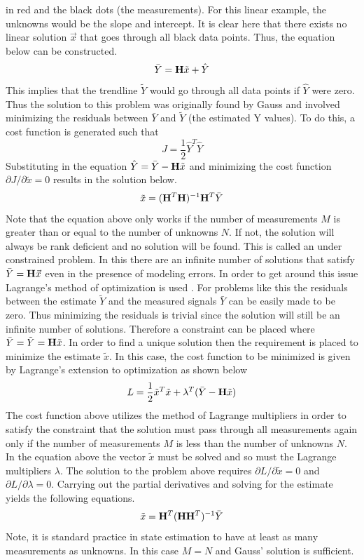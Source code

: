 \documentclass{article}
\begin{document}
in red and the black dots (the measurements). For this linear example,
the unknowns would be the slope and intercept. It is clear here that
there exists no linear solution $\vec{x}$ that goes through all black
data points. Thus, the equation below can be constructed.
\begin{equation}
  \bar{Y} = {\bf H}\tilde{x} + \hat{Y}
\end{equation}
This implies that the trendline $\tilde{Y}$ would go through all data
points if $\hat{Y}$ were zero. Thus the solution to this problem was
originally found by Gauss \cite{stigler1981} and involved minimizing
the residuals between $\bar{Y}$ and $\tilde{Y}$ (the estimated Y
values). To do this, a cost function is generated such that
\begin{equation}
  J = \frac{1}{2}\hat{Y}^T \hat{Y}
\end{equation}
Substituting in the equation $\hat{Y} = \bar{Y} - {\bf H}\tilde{x}$
and minimizing the cost function $\partial J/\partial \tilde{x} = 0$
results in the solution below.
\begin{equation}
  \tilde{x} = ({\bf H}^T{\bf H})^{-1}{\bf H}^T\bar{Y}
\end{equation}
Note that the equation above only works if the number of measurements $M$
is greater than or equal to the number of unknowns $N$. If not, the
solution will always be rank deficient and no solution will be
found. This is called an under constrained problem. In this there are
an infinite number of solutions that satisfy $\bar{Y} = {\bf
  H}\vec{x}$ even in the presence of modeling errors. In order
to get around this issue Lagrange's method of 
optimization is used \cite{lagrange}. For problems like this the
residuals between the estimate $\tilde{Y}$ and the measured signals
$\bar{Y}$ can be easily made to be zero. Thus minimizing the residuals
is trivial since the solution will still be an infinite number of
solutions. Therefore a constraint can be placed where
$\bar{Y}=\tilde{Y}={\bf H}\tilde{x}$. In order to find a unique
solution then the requirement is placed to minimize the estimate
$\tilde{x}$. In this case, the cost function
to be minimized is given by Lagrange's extension to optimization as
shown below
\begin{equation}
L = \frac{1}{2}\tilde{x}^T\tilde{x} + \lambda^T(\bar{Y}-{\bf H}\tilde{x})
\end{equation}
The cost function above utilizes the method of Lagrange multipliers in
order to satisfy the constraint that the solution must pass through
all measurements again only if the number of measurements $M$ is less than
the number of unknowns $N$. In the equation above the vector
$\tilde{x}$ must be solved and so must the Lagrange multipliers
$\lambda$. The solution to the problem above requires
$\partial L / \partial \tilde{x} = 0$ and $\partial L / \partial \lambda = 0$. Carrying out the partial derivatives and solving for the estimate
yields the following equations. 
\begin{equation}
  \tilde{x} = {\bf H}^T({\bf H}{\bf H}^T)^{-1}\bar{Y}
\end{equation}
Note, it is standard practice in state estimation to have at least as
many measurements as unknowns. In this case $M=N$ and Gauss' solution
is sufficient. 
\end{document}
